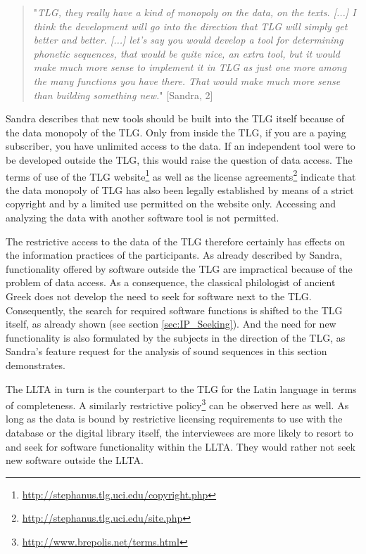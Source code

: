\documentclass[12pt, a4paper, titlepage, oneside, abstract=true, toc=listof, toc=bibliography, BCOR=1cm]{scrreprt}
\begin{document}
{\begin{quotation}
"\textit{TLG, they really have a kind of monopoly on the data, on the texts. [...] I think the development will go into the direction that TLG will simply get better and better. [...] let's say you would develop a tool for determining phonetic sequences, that would be quite nice, an extra tool, but it would make much more sense to implement it in TLG as just one more among the many functions you have there. That would make much more sense than building something new.}" [Sandra, 2]
\end{quotation}

Sandra describes that new tools should be built into the TLG itself because of the data monopoly of the TLG. Only from inside the TLG, if you are a paying subscriber, you have unlimited access to the data. If an independent tool were to be developed outside the TLG, this would raise the question of data access. 
The terms of use of the TLG website\footnote{\url{http://stephanus.tlg.uci.edu/copyright.php}} as well as the license agreements\footnote{\url{http://stephanus.tlg.uci.edu/site.php}} indicate that the data monopoly of TLG has also been legally established by means of a strict copyright and by a limited use permitted on the website only. Accessing and analyzing the data with another software tool is not permitted.

The restrictive access to the data of the TLG therefore certainly has effects on the information practices of the participants. As already described by Sandra, functionality offered by software outside the TLG are impractical because of the problem of data access. As a consequence, the classical philologist of ancient Greek does not develop the need to seek for software next to the TLG.
Consequently, the search for required software functions is shifted to the TLG itself, as already shown (see section \ref{sec:IP_Seeking}). And the need for new functionality is also formulated by the subjects in the direction of the TLG, as Sandra's feature request for the analysis of sound sequences in this section demonstrates.

The LLTA in turn is the counterpart to the TLG for the Latin language in terms of completeness. A similarly restrictive policy\footnote{\url{http://www.brepolis.net/terms.html}} can be observed here as well. As long as the data is bound by restrictive licensing requirements to use with the database or the digital library itself, the interviewees are more likely to resort to and seek for software functionality within the LLTA. They would rather not seek new software outside the LLTA.

}
\end{document}
